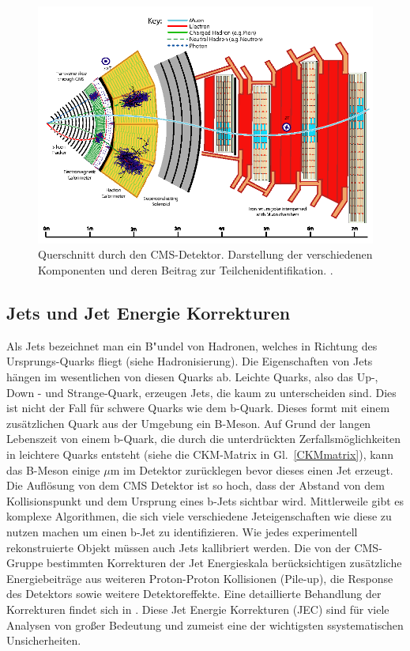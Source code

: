 \begin{figure}[ht]
	\centering
	\includegraphics[scale=0.45]{LHC/cms_particle_identification}
	\caption[CMS im Querschnitt]{Querschnitt durch den CMS-Detektor. Darstellung der verschiedenen Komponenten und deren Beitrag zur Teilchenidentifikation. \cite{Sirunyan:2270046}.}
	\label{cernkomplex}
\end{figure}
\clearpage
\subsection{Jets und Jet Energie Korrekturen} 
Als Jets bezeichnet man ein B"undel von Hadronen, welches in Richtung des Ursprungs-Quarks fliegt (siehe Hadronisierung). 
Die Eigenschaften von Jets hängen im wesentlichen von diesen Quarks ab. Leichte Quarks, also das Up-, Down - und Strange-Quark, erzeugen Jets, die kaum zu unterscheiden sind. Dies ist nicht der Fall für schwere Quarks wie dem b-Quark. Dieses formt mit einem zusätzlichen Quark aus der Umgebung ein B-Meson. Auf Grund der langen Lebenszeit von einem b-Quark, die durch die unterdrückten Zerfallsmöglichkeiten in leichtere Quarks entsteht (siehe die CKM-Matrix in Gl.~\ref{CKMmatrix}), kann das B-Meson einige $\mu\mathrm{m}$ im Detektor zurücklegen bevor dieses einen Jet erzeugt. Die Auflösung von dem CMS Detektor ist so hoch, dass der Abstand von dem Kollisionspunkt und dem Ursprung eines b-Jets  sichtbar wird. Mittlerweile gibt es komplexe Algorithmen, die sich viele verschiedene Jeteigenschaften wie diese zu nutzen machen um einen b-Jet zu identifizieren.
Wie jedes experimentell rekonstruierte Objekt m\"ussen auch Jets kallibriert werden.
Die von der CMS-Gruppe bestimmten Korrekturen der Jet Energieskala ber\"ucksichtigen zusätzliche Energiebeitr\"age aus weiteren Proton-Proton Kollisionen (Pile-up), die Response des Detektors sowie
weitere Detektoreffekte. Eine detaillierte Behandlung der Korrekturen findet sich in \cite{Khachatryan:2016kdb}. Diese Jet Energie Korrekturen (JEC) sind f\"ur viele Analysen von gro\ss{}er Bedeutung und zumeist eine der wichtigsten ssystematischen Unsicherheiten.  

